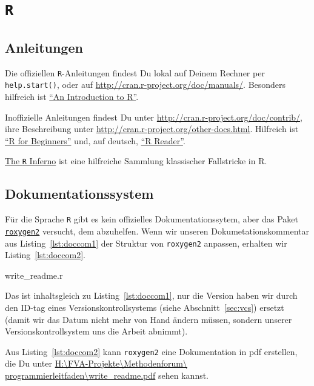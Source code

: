 \documentclass[twoside]{scrreprt}
\providecommand{\R}{\texttt{R}}
\providecommand{\code}[1]{\texttt{#1}}
\providecommand{\proot}{%
H:\textbackslash{}FVA-Projekte\textbackslash{}Methodenforum\textbackslash{}%
}
\providecommand{\pdir}{\proot{}programmierleitfaden\textbackslash{}}
\begin{document}
\section{\R{}}
\subsection{Anleitungen }
Die offiziellen  \R{}-Anleitungen findest Du lokal auf Deinem Rechner per 
\code{help.start()}, oder auf \url{http://cran.r-project.org/doc/manuals/}.
Besonders hilfreich ist 
\linebreak{}
\href{http://cran.r-project.org/doc/manuals/r-release/R-intro.pdf}
{"`An Introduction to R"'}.

Inoffizielle Anleitungen findest Du unter 
\url{http://cran.r-project.org/doc/contrib/}, ihre Beschreibung unter 
\url{http://cran.r-project.org/other-docs.html}. Hilfreich ist 
\href{http://cran.r-project.org/doc/contrib/Paradis-rdebuts_en.pdf}
{"`R for Beginners"'} 
und, auf deutsch, 
\href{http://cran.r-project.org/doc/contrib/Grosz+Peters-R-Reader.pdf}
{"`R Reader"'}.

\href{http://www.burns-stat.com/pages/Tutor/R_inferno.pdf}{The \R{} Inferno} ist
eine hilfreiche Sammlung klassischer Fallstricke in R. 

\subsection{Dokumentationssystem}
F\"u{}r die Sprache \R{}
gibt es kein offizielles Dokumentationssytem, aber 
das Paket \href{http://cran.r-project.org/web/packages/roxygen2/index.html}
{\code{roxygen2}} versucht, dem abzuhelfen. 
Wenn wir unseren Dokumetationskommentar aus Listing~\ref{lst:doccom1} der 
Struktur von \code{roxygen2} anpassen, erhalten wir Listing~\ref{lst:doccom2}.

%
{write_readme.r}

Das ist inhaltsgleich zu  Listing~\ref{lst:doccom1}, nur die Version haben wir 
durch den ID-tag eines Versionskontrollsystems (siehe Abschnitt~\ref{sec:vcs}) 
ersetzt (damit wir das Datum nicht mehr von Hand
\"a{}ndern m\"u{}ssen, sondern unserer Versionskontrollsystem uns die Arbeit
abnimmt).

Aus Listing~\ref{lst:doccom2}  kann \code{roxygen2} eine Dokumentation in pdf 
erstellen, die Du unter \href{write_readme.pdf}{\pdir{}write\_readme.pdf} sehen 
kannst.
\end{document}
